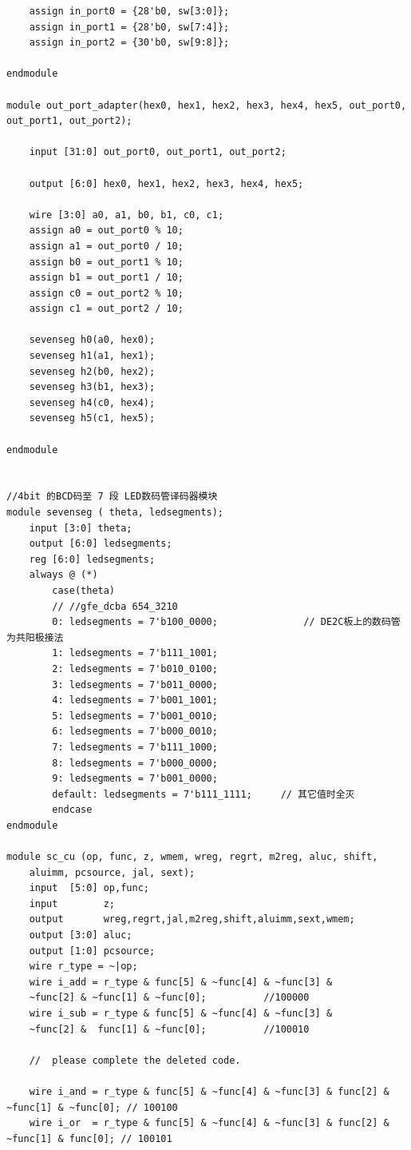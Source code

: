 \documentclass[UTF8]{ctexart}
\begin{document}
\begin{verbatim}
    assign in_port0 = {28'b0, sw[3:0]};
    assign in_port1 = {28'b0, sw[7:4]};
    assign in_port2 = {30'b0, sw[9:8]};

endmodule

module out_port_adapter(hex0, hex1, hex2, hex3, hex4, hex5, out_port0, out_port1, out_port2);

    input [31:0] out_port0, out_port1, out_port2;

    output [6:0] hex0, hex1, hex2, hex3, hex4, hex5;

    wire [3:0] a0, a1, b0, b1, c0, c1;
    assign a0 = out_port0 % 10;
    assign a1 = out_port0 / 10;
    assign b0 = out_port1 % 10;
    assign b1 = out_port1 / 10;
    assign c0 = out_port2 % 10;
    assign c1 = out_port2 / 10;

    sevenseg h0(a0, hex0);
    sevenseg h1(a1, hex1);
    sevenseg h2(b0, hex2);
    sevenseg h3(b1, hex3);
    sevenseg h4(c0, hex4);
    sevenseg h5(c1, hex5);

endmodule


//4bit 的BCD码至 7 段 LED数码管译码器模块
module sevenseg ( theta, ledsegments);
    input [3:0] theta;
    output [6:0] ledsegments;
    reg [6:0] ledsegments;
    always @ (*)
        case(theta)
        // //gfe_dcba 654_3210
        0: ledsegments = 7'b100_0000;				// DE2C板上的数码管为共阳极接法
        1: ledsegments = 7'b111_1001;
        2: ledsegments = 7'b010_0100;
        3: ledsegments = 7'b011_0000;
        4: ledsegments = 7'b001_1001;
        5: ledsegments = 7'b001_0010;
        6: ledsegments = 7'b000_0010;
        7: ledsegments = 7'b111_1000;
        8: ledsegments = 7'b000_0000;
        9: ledsegments = 7'b001_0000;
        default: ledsegments = 7'b111_1111; 	// 其它值时全灭
        endcase
endmodule

module sc_cu (op, func, z, wmem, wreg, regrt, m2reg, aluc, shift,
    aluimm, pcsource, jal, sext);
    input  [5:0] op,func;
    input        z;
    output       wreg,regrt,jal,m2reg,shift,aluimm,sext,wmem;
    output [3:0] aluc;
    output [1:0] pcsource;
    wire r_type = ~|op;
    wire i_add = r_type & func[5] & ~func[4] & ~func[3] &
    ~func[2] & ~func[1] & ~func[0];          //100000
    wire i_sub = r_type & func[5] & ~func[4] & ~func[3] &
    ~func[2] &  func[1] & ~func[0];          //100010

    //  please complete the deleted code.

    wire i_and = r_type & func[5] & ~func[4] & ~func[3] & func[2] & ~func[1] & ~func[0]; // 100100
    wire i_or  = r_type & func[5] & ~func[4] & ~func[3] & func[2] & ~func[1] & func[0]; // 100101


\end{verbatim}
\end{document}
